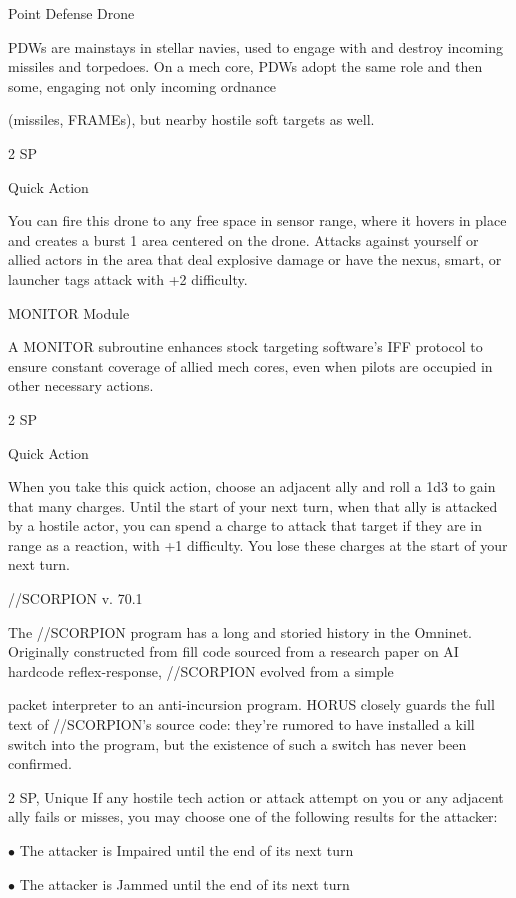 Point Defense Drone  

PDWs are mainstays in stellar navies, used to engage with and destroy incoming missiles and torpedoes.  
On a mech core, PDWs adopt the same role and then some, engaging not only incoming ordnance  

(missiles, FRAMEs), but nearby hostile soft targets as well.   

2 SP  

Quick Action
 
You can fire this drone to any free space in sensor range, where it hovers in place and creates a  
burst 1 area centered on the drone. Attacks against yourself or allied actors in the area that deal  
explosive damage or have the nexus, smart, or launcher tags attack with +2 difficulty.
 

MONITOR Module  

A MONITOR subroutine enhances stock targeting software’s IFF protocol to ensure constant coverage of  
allied mech cores, even when pilots are occupied in other necessary actions.   

2 SP
 
Quick Action
 
When you take this quick action, choose an adjacent ally and roll a 1d3 to gain that many  
charges. Until the start of your next turn, when that ally is attacked by a hostile actor, you can  
spend a charge to attack that target if they are in range as a reaction, with +1 difficulty. You lose  
these charges at the start of your next turn.
 

//SCORPION v. 70.1  

The //SCORPION program has a long and storied history in the Omninet. Originally constructed from fill  
code sourced from a research paper on AI hardcode reflex-response, //SCORPION evolved from a simple  

packet interpreter to an anti-incursion program. HORUS closely guards the full text of //SCORPION’s  
source code: they’re rumored to have installed a kill switch into the program, but the existence of such a  
switch has never been confirmed.    

2 SP, Unique  
If any hostile tech action or attack attempt on you or any adjacent ally fails or misses, you may  
choose one of the following results for the attacker:
 
     $\bullet$    The attacker is Impaired until the end of its next turn
 
     $\bullet$    The attacker is Jammed until the end of its next turn
 

